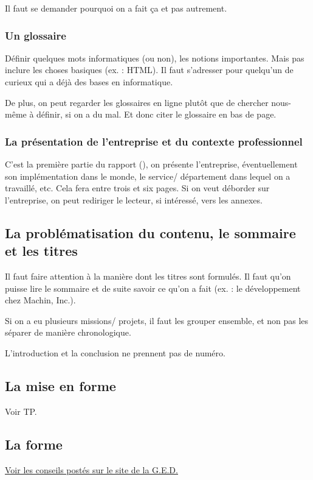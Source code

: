 \documentclass[final, a4paper, 11pt]{article}
\begin{document}
Il faut se demander pourquoi on a fait ça et pas autrement.

\subsubsection{Un glossaire}
Définir quelques mots informatiques (ou non), les notions importantes. Mais pas inclure les choses basiques (ex. : HTML). Il faut s'adresser pour quelqu'un de curieux qui a déjà des bases en informatique.

De plus, on peut regarder les glossaires en ligne plutôt que de chercher nous-même à définir, si on a du mal. Et donc citer le glossaire en bas de page.

\subsubsection{La présentation de l'entreprise et du contexte professionnel}
C'est la première partie du rapport (), on présente l'entreprise, éventuellement son implémentation dans le monde, le service/ département dans lequel on a travaillé, etc. Cela fera entre trois et six pages. Si on veut déborder sur l'entreprise, on peut rediriger le lecteur, si intéressé, vers les annexes.

\subsection{La problématisation du contenu, le sommaire et les titres}
Il faut faire attention à la manière dont les titres sont formulés. Il faut qu'on puisse lire le sommaire et de suite savoir ce qu'on a fait (ex. : le développement chez Machin, Inc.).

Si on a eu plusieurs missions/ projets, il faut les grouper ensemble, et non pas les séparer de manière chronologique.

L'introduction et la conclusion ne prennent pas de numéro.

\subsection{La mise en forme}
Voir TP.

\subsection{La forme}
\href{https://ged.unistra.fr/nuxeo/nxfile/default/2f907782-9fe9-4b62-a9d8-4b8f883e6510/blobholder:0/Conseils\%20pour\%20le\%20rapport\%20et\%20la\%20soutenance.pdf}{Voir les conseils postés sur le site de la G.E.D.}
\end{document}
